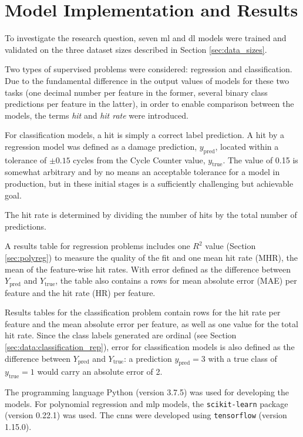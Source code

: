 \chapter{Model Implementation and Results} \label{sec:practical}
To investigate the research question, seven \ac{ml} and \ac{dl} models were trained and validated on the three dataset sizes described in Section \ref{sec:data_sizes}.

Two types of supervised problems were considered: regression and classification. Due to the fundamental difference in the output values of models for these two tasks (one decimal number per feature in the former, several binary class predictions per feature in the latter), in order to enable comparison between the models, the terms \textit{hit} and \textit{hit rate} were introduced.

For classification models, a hit is simply a correct label prediction. A hit by a regression model was defined as a damage prediction, \(y_\text{pred}\), located within a tolerance of \(\pm0.15\) cycles from the Cycle Counter value, \(y_\text{true}\). The value of 0.15 is somewhat arbitrary and by no means an acceptable tolerance for a model in production, but in these initial stages is a sufficiently challenging but achievable goal.

The hit rate is determined by dividing the number of hits by the total number of predictions.

A results table for regression problems includes one \(R^2\) value (Section \ref{sec:polyreg}) to measure the quality of the fit and one mean hit rate (MHR), the mean of the feature-wise hit rates. With error defined as the difference between \(Y_\text{pred}\) and \(Y_\text{true}\), the table also contains a rows for mean absolute error (MAE) per feature and the hit rate (HR) per feature.

Results tables for the classification problem contain rows for the hit rate per feature and the mean absolute error per feature, as well as one value for the total hit rate. Since the class labels generated are ordinal (see Section \ref{sec:data:classification_rep}), error for classification models is also defined as the difference between \(Y_\text{pred}\) and \(Y_\text{true}\): a prediction \(y_\text{pred} = 3\) with a true class of \(y_\text{true} = 1\) would carry an absolute error of 2.

The programming language Python (version 3.7.5) was used for developing the models. For polynomial regression and \ac{mlp} models, the \texttt{scikit-learn} package (version 0.22.1) was used. The \ac{cnn}s were developed using \texttt{tensorflow} (version 1.15.0).

